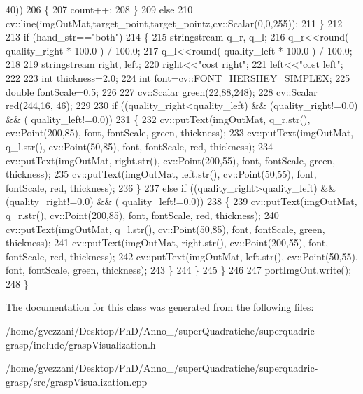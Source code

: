 \begin{DoxyCode}
      40))
206             \{
207                 count++;
208             \}
209             \textcolor{keywordflow}{else}
210                 cv::line(imgOutMat,target\_point,target\_pointz,cv::Scalar(0,0,255));            
211         \}
212 
213         \textcolor{keywordflow}{if} (hand\_str==\textcolor{stringliteral}{"both"})
214         \{
215             stringstream q\_r, q\_l;
216             q\_r<<round( quality_right * 100.0 ) / 100.0;
217             q\_l<<round( quality_left * 100.0 ) / 100.0;
218 
219             stringstream right, left;
220             right<<\textcolor{stringliteral}{"cost right"};
221             left<<\textcolor{stringliteral}{"cost left"};
222 
223             \textcolor{keywordtype}{int} thickness=2.0;
224             \textcolor{keywordtype}{int} font=cv::FONT\_HERSHEY\_SIMPLEX;
225             \textcolor{keywordtype}{double} fontScale=0.5;
226 
227             cv::Scalar green(22,88,248);
228             cv::Scalar red(244,16, 46);
229 
230             \textcolor{keywordflow}{if} ((quality_right<quality_left) && (quality_right!=0.0) && (
      quality_left!=0.0))
231             \{
232                 cv::putText(imgOutMat, q\_r.str(), cv::Point(200,85), font, fontScale, green, thickness);
233                 cv::putText(imgOutMat, q\_l.str(), cv::Point(50,85), font, fontScale, red, thickness);
234                 cv::putText(imgOutMat, right.str(), cv::Point(200,55), font, fontScale, green, thickness);
235                 cv::putText(imgOutMat, left.str(), cv::Point(50,55), font, fontScale, red, thickness);
236             \}
237             \textcolor{keywordflow}{else} \textcolor{keywordflow}{if} ((quality_right>quality_left) && (quality_right!=0.0) && (
      quality_left!=0.0))
238             \{
239                 cv::putText(imgOutMat, q\_r.str(), cv::Point(200,85), font, fontScale, red, thickness);
240                 cv::putText(imgOutMat, q\_l.str(), cv::Point(50,85), font, fontScale, green, thickness);
241                 cv::putText(imgOutMat, right.str(), cv::Point(200,55), font, fontScale, red, thickness);
242                 cv::putText(imgOutMat, left.str(), cv::Point(50,55), font, fontScale, green, thickness);
243             \}
244         \}            
245     \}
246 
247     portImgOut.write();
248 \}
\end{DoxyCode}


The documentation for this class was generated from the following files\+:\begin{DoxyCompactItemize}
\item 
/home/gvezzani/\+Desktop/\+Ph\+D/\+Anno\+\_/super\+Quadratiche/superquadric-\/grasp/include/grasp\+Visualization.\+h\item 
/home/gvezzani/\+Desktop/\+Ph\+D/\+Anno\+\_/super\+Quadratiche/superquadric-\/grasp/src/grasp\+Visualization.\+cpp\end{DoxyCompactItemize}
